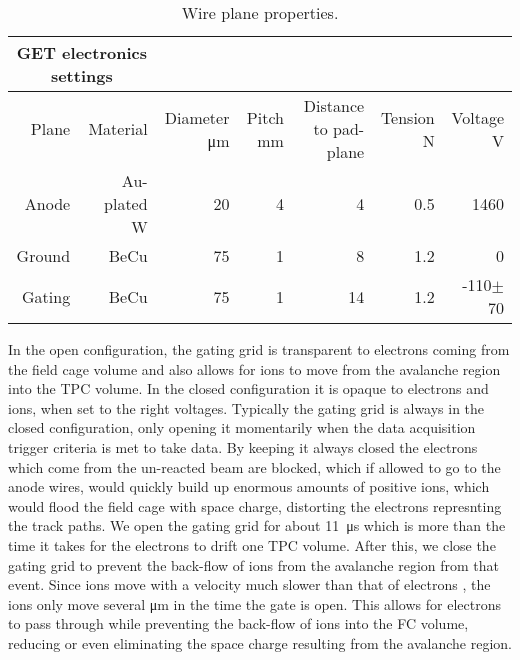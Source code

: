  \begin{table*}[!htb]
 \centering
{}
\begin{tabular}{@{}rrrrrrr@{}}\toprule 
\multicolumn{2}{c}{GET electronics settings}\\
\midrule
 Plane & Material & Diameter \si{\micro\metre} & Pitch \si{\milli\metre} & Distance to pad-plane & Tension \si{\newton} & Voltage \si{\volt}\\ [0.5ex] 
 Anode  & Au-plated W   &  20  &  4  &  4   &  0.5  &  1460  \\
 Ground & BeCu          &  75  &  1  &  8   &  1.2  &  0     \\ 
 Gating & BeCu          &  75  &  1  &  14   &  1.2 &  -110$\pm$ 70\\ 
 \bottomrule
\end{tabular}
\caption{Wire plane properties.}
\label{tb:wireplane}
\end{table*}

In the open configuration, the gating grid is transparent to electrons coming from the field cage volume and also allows for ions to move from the avalanche region into the TPC volume. In the closed configuration it is opaque to electrons and ions, when set to the right voltages. Typically the gating grid is always in the closed configuration, only opening it momentarily when the data acquisition trigger criteria is met to take data. By keeping it always closed the electrons which come from the un-reacted beam are blocked,  which if allowed to go to the anode wires, would quickly build up enormous amounts of positive ions, which would flood the field cage with space charge, distorting the electrons represnting the track paths. We open the gating grid for about \SI{11}{\micro\second} which is more than the time it takes for the electrons to drift one TPC volume. After this, we close the gating grid to prevent the back-flow of ions from the avalanche region from that event. Since ions move with a velocity much slower than that of electrons \cite{blumrol}, the ions only move several \si{\micro\metre} in the time the gate is open. This allows for electrons to pass through while preventing the back-flow of ions into the FC volume, reducing or even eliminating the space charge resulting from the avalanche region.

